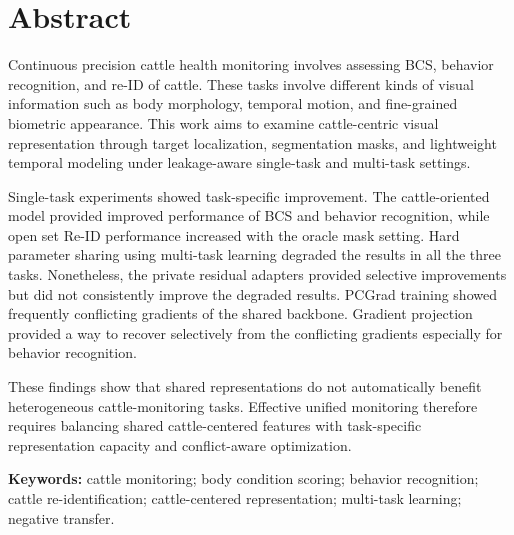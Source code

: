 \section*{Abstract}

Continuous precision cattle health monitoring involves assessing BCS, behavior recognition, and re-ID of cattle. These tasks involve different kinds of visual information such as body morphology, temporal motion, and fine-grained biometric appearance. This work aims to examine cattle-centric visual representation through target localization, segmentation masks, and lightweight temporal modeling under leakage-aware single-task and multi-task settings.

Single-task experiments showed task-specific improvement. The cattle-oriented model provided improved performance of BCS and behavior recognition, while open set Re-ID performance increased with the oracle mask setting. Hard parameter sharing using multi-task learning degraded the results in all the three tasks. Nonetheless, the private residual adapters provided selective improvements but did not consistently improve the degraded results. PCGrad training showed frequently conflicting gradients of the shared backbone. Gradient projection provided a way to recover selectively from the conflicting gradients especially for behavior recognition.

These findings show that shared representations do not automatically benefit heterogeneous cattle-monitoring tasks. Effective unified monitoring therefore requires balancing shared cattle-centered features with task-specific representation capacity and conflict-aware optimization.

\vspace{1em}
\noindent\textbf{Keywords:} cattle monitoring; body condition scoring; behavior recognition; cattle re-identification; cattle-centered representation; multi-task learning; negative transfer.

\clearpage
